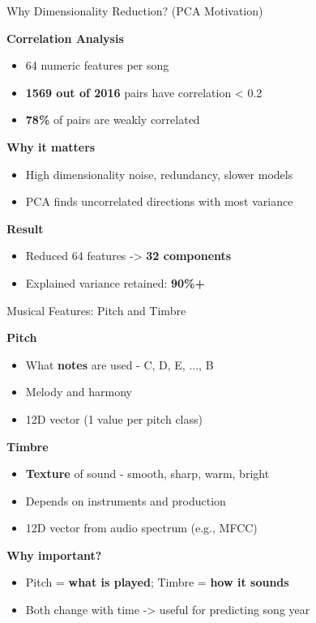 \documentclass{beamer}
\begin{document}
\begin{frame}{Why Dimensionality Reduction? (PCA Motivation)}

\textbf{Correlation Analysis}
\begin{itemize}
    \item 64 numeric features per song
    \item \textbf{1569 out of 2016} pairs have correlation \textless{} 0.2
    \item \textbf{78\%} of pairs are weakly correlated
\end{itemize}

\textbf{Why it matters}
\begin{itemize}
    \item High dimensionality \rightarrow noise, redundancy, slower models
    \item PCA finds uncorrelated directions with most variance
\end{itemize}

\textbf{Result}
\begin{itemize}
    \item Reduced 64 features -> \textbf{32 components}
    \item Explained variance retained: \textbf{90\%+}
\end{itemize}

\end{frame}

\begin{frame}{Musical Features: Pitch and Timbre}

\textbf{Pitch}
\begin{itemize}
    \item What \textbf{notes} are used - C, D, E, ..., B
    \item Melody and harmony
    \item 12D vector (1 value per pitch class)
\end{itemize}

\textbf{Timbre}
\begin{itemize}
    \item \textbf{Texture} of sound - smooth, sharp, warm, bright
    \item Depends on instruments and production
    \item 12D vector from audio spectrum (e.g., MFCC)
\end{itemize}


\textbf{Why important?}
\begin{itemize}
    \item Pitch = \textbf{what is played}; Timbre = \textbf{how it sounds}
    \item Both change with time -> useful for predicting song year
\end{itemize}

\end{frame}
\end{document}
